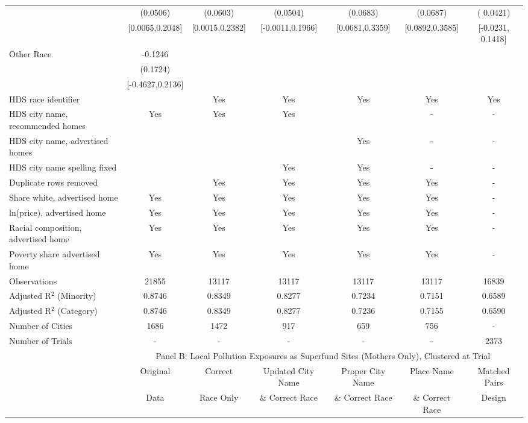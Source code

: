 \begin{table}[htbp]
{\begin{tabular}{l*{6}{c}}
 & (0.0506) & (0.0603) & (0.0504) & (0.0683) & (0.0687) & ( 0.0421) \\
 & [0.0065,0.2048] & [0.0015,0.2382] & [-0.0011,0.1966] & [0.0681,0.3359] & [0.0892,0.3585] & [-0.0231,  0.1418] \\
Other Race & -0.1246 &  &  &  &  &  \\
 & (0.1724) &  &  &  &  &  \\
 & [-0.4627,0.2136] &  &  &  &  &  \\
\midrule
HDS race identifier & & Yes & Yes & Yes & Yes & Yes \\
HDS city name, recommended homes & Yes & Yes & Yes & & - & -\\
HDS city name, advertised homes &  &  &  & Yes & - & -\\
HDS city name spelling fixed & & & Yes & Yes & - & -\\
Duplicate rows removed &  & Yes & Yes & Yes & Yes & - \\
\midrule
Share white, advertised home  & Yes & Yes & Yes & Yes & Yes & - \\
ln(price), advertised home  & Yes & Yes & Yes & Yes & Yes & - \\
Racial composition, advertised home & Yes & Yes & Yes & Yes & Yes & - \\
Poverty share advertised home & Yes & Yes & Yes & Yes & Yes & - \\
Observations & 21855 & 13117 & 13117 & 13117 & 13117 & 16839 \\
Adjusted R$^2$ (Minority) & 0.8746 & 0.8349 & 0.8277 & 0.7234 & 0.7151 & 0.6589 \\
Adjusted R$^2$ (Category) & 0.8746 & 0.8349 & 0.8277 & 0.7236 & 0.7155 & 0.6590 \\
Number of Cities & 1686 & 1472 & 917 & 659 & 756 & - \\
Number of Trials & - & - & - & - & - & 2373 \\
\bottomrule
\toprule
& \multicolumn{6}{c}{Panel B: Local Pollution Exposures as Superfund Sites (Mothers Only), Clustered at Trial}\\
\toprule
                    &\multicolumn{1}{c}{Original}&\multicolumn{1}{c}{Correct}&\multicolumn{1}{c}{Updated City Name}&\multicolumn{1}{c}{Proper City Name}&\multicolumn{1}{c}{Place Name}&\multicolumn{1}{c}{Matched Pairs}\\
                      &\multicolumn{1}{c}{Data}&\multicolumn{1}{c}{Race Only}&\multicolumn{1}{c}{\& Correct Race}&\multicolumn{1}{c}{\& Correct Race}&\multicolumn{1}{c}{\& Correct Race}&\multicolumn{1}{c}{Design}\\                  

\end{tabular}}
\end{table}
